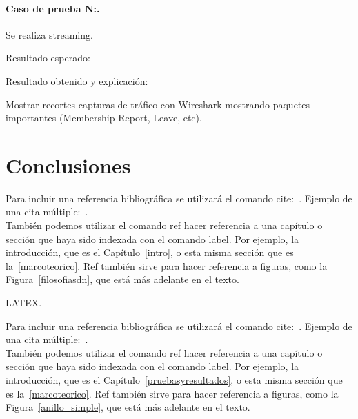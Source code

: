 \documentclass[12pt,a4paper,oneside]{book}
\begin{document}
\subsubsection{Caso de prueba N:.} 
Se realiza streaming.

\vspace{0.5cm}
Resultado esperado: 

\vspace{0.5cm}
Resultado obtenido y explicación: 

\vspace{0.5cm}
Mostrar recortes-capturas de tráfico con Wireshark mostrando paquetes importantes (Membership Report, Leave, etc).


\chapter{Conclusiones}
\label{conclusiones}

Para incluir una referencia bibliográfica se utilizará el comando cite:~\cite{girard1989}.
Ejemplo de una cita múltiple:~\cite{ranta2012,tcs2015}.\\

También podemos utilizar el comando ref hacer referencia a una capítulo o sección que haya sido indexada con el comando label. Por ejemplo, la introducción, que es el Capítulo~\ref{intro}, o esta misma sección que es la~\ref{marcoteorico}. Ref también sirve para hacer referencia a  figuras, como la Figura~\ref{filosofiasdn}, que está más adelante en el texto.

LATEX.

Para incluir una referencia bibliográfica se utilizará el comando cite:~\cite{girard1989}.
Ejemplo de una cita múltiple:~\cite{ranta2012,tcs2015}.\\

También podemos utilizar el comando ref hacer referencia a una capítulo o sección que haya sido indexada con el comando label. Por ejemplo, la introducción, que es el Capítulo~\ref{pruebasyresultados}, o esta misma sección que es la~\ref{marcoteorico}. Ref también sirve para hacer referencia a figuras, como la Figura~\ref{anillo_simple}, que está más adelante en el texto.




\renewcommand{\bibname}{Referencias bibliográficas} 
\end{document}
